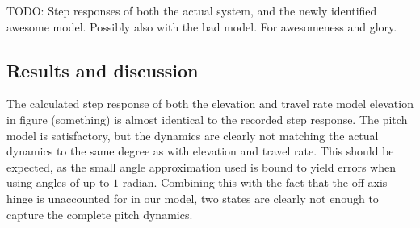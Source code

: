 TODO: Step responses of both the actual system, and the newly identified awesome model. Possibly also with the bad model. For awesomeness and glory.


\subsection{Results and discussion}

The calculated step response of both the elevation and travel rate model elevation in figure (something) is almost identical to the recorded step response. The pitch model is satisfactory, but the dynamics are clearly not matching the actual dynamics to the same degree as with elevation and travel rate. This should be expected, as the small angle approximation used is bound to yield errors when using angles of up to $1$ radian. Combining this with the fact that the off axis hinge is unaccounted for in our model, two states are clearly not enough to capture the complete pitch dynamics.




